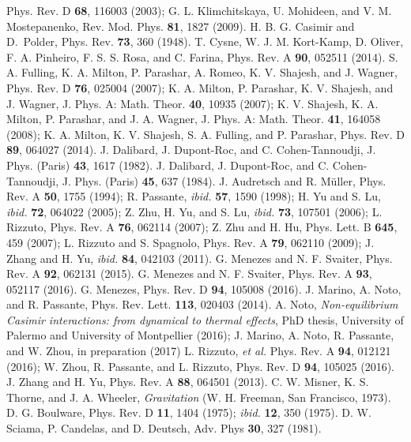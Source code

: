 \documentclass[twocolumn,prd,aps,showpacs,amsmath,amssymb]{revtex4-1}
\begin{document}
\begin{thebibliography}{99}
Phys. Rev. D {\bf 68}, 116003 (2003);
G. L. Klimchitskaya, U. Mohideen, and V. M. Mostepanenko, Rev. Mod. Phys. {\bf 81}, 1827 (2009).
%
 H. B. G. Casimir and D.~Polder, Phys. Rev. {\bf 73}, 360 (1948).
%
 T. Cysne, W. J. M. Kort-Kamp, D. Oliver, F. A. Pinheiro, F. S. S. Rosa, and C. Farina, Phys. Rev. A {\bf 90}, 052511 (2014).
%
 S. A. Fulling, K. A. Milton, P. Parashar, A. Romeo, K. V. Shajesh, and J. Wagner, 
Phys. Rev. D {\bf 76}, 025004 (2007); 
K. A. Milton, P. Parashar, K. V. Shajesh, and J. Wagner,  J. Phys. A: Math. Theor. {\bf 40}, 10935 (2007);
K. V. Shajesh, K. A. Milton, P. Parashar, and J. A. Wagner, J. Phys. A: Math. Theor. {\bf 41}, 164058 (2008);
K. A. Milton, K. V. Shajesh, S. A. Fulling, and P. Parashar, Phys. Rev. D {\bf 89}, 064027 (2014).
%
 J. Dalibard, J. Dupont-Roc, and C. Cohen-Tannoudji,
  J. Phys. (Paris) {\bf 43}, 1617 (1982). 
%
 J. Dalibard, J. Dupont-Roc, and C. Cohen-Tannoudji, J. Phys. (Paris) {\bf 45}, 637 (1984).
%
 J. Audretsch and R. M\"uller, Phys. Rev. A {\bf 50}, 1755 (1994); 
R. Passante, {\em ibid.} {\bf 57}, 1590 (1998); 
H. Yu and S. Lu, {\em ibid.} {\bf 72}, 064022 (2005);  
Z. Zhu, H. Yu, and S. Lu, {\em ibid.} {\bf 73}, 107501 (2006); 
L. Rizzuto, Phys. Rev. A {\bf 76}, 062114 (2007);  
Z. Zhu and H. Hu, Phys. Lett. B {\bf 645}, 459 (2007); 
L. Rizzuto and S. Spagnolo, Phys. Rev. A {\bf 79}, 062110 (2009); 
J. Zhang and H. Yu, {\em ibid.} {\bf 84}, 042103 (2011).
%
 G. Menezes and N. F. Svaiter,  Phys. Rev. A {\bf 92}, 062131 (2015). 
%
 G. Menezes and N. F. Svaiter, Phys. Rev. A {\bf 93}, 052117 (2016).
%
 G. Menezes, Phys. Rev. D {\bf 94}, 105008 (2016).
%
 J. Marino, A. Noto, and R. Passante, Phys. Rev. Lett. {\bf 113}, 020403 (2014). 
%
 A. Noto, \emph{Non-equilibrium Casimir interactions: from dynamical to thermal effects}, PhD thesis, University of Palermo and University of Montpellier (2016); 
J. Marino, A. Noto, R. Passante, and W. Zhou, in preparation (2017) 
%
 L. Rizzuto, \emph{et al.} Phys. Rev. A {\bf 94}, 012121 (2016); 
W. Zhou, R. Passante, and L. Rizzuto, Phys. Rev. D {\bf 94}, 105025 (2016). 
%
 J. Zhang and H. Yu, Phys. Rev. A {\bf 88}, 064501 (2013).
%
%
 C. W. Misner, K. S. Thorne, and J. A. Wheeler, {\it
    Gravitation} (W. H. Freeman, San Francisco, 1973). 
%
 D. G. Boulware, Phys. Rev. D {\bf 11}, 1404 (1975);
  {\em ibid.} {\bf 12}, 350 (1975). 
%
 D. W. Sciama, P. Candelas, and D. Deutsch, Adv. Phys {\bf 30}, 327 (1981). 

\end{thebibliography}
\end{document}
